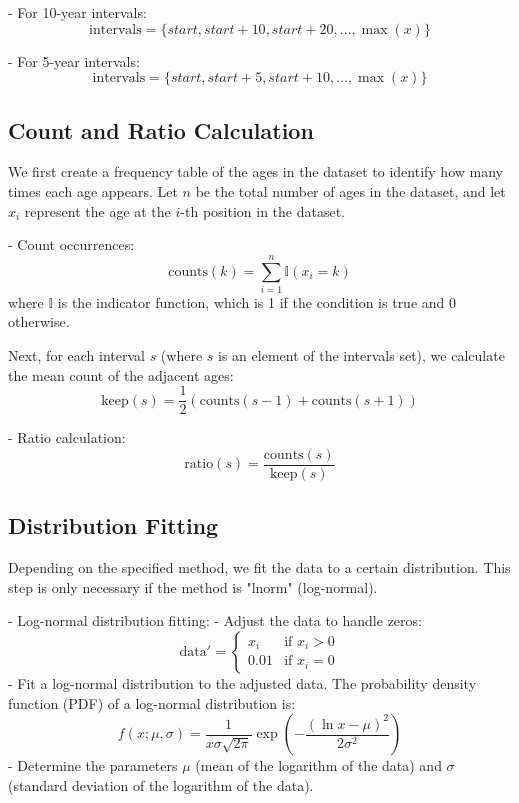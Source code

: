 \documentclass[pdflatex,sn-mathphys-num]{sn-jnl}%
\theoremstyle{thmstyleone}%
\theoremstyle{thmstyletwo}%
\theoremstyle{thmstylethree}%
\begin{document}
- For 10-year intervals:
  \[
  \text{intervals} = \{start, start + 10, start + 20, \ldots, \max(x)\}
  \]

- For 5-year intervals:
  \[
  \text{intervals} = \{start, start + 5, start + 10, \ldots, \max(x)\}
  \]

\subsection{Count and Ratio Calculation}

We first create a frequency table of the ages in the dataset to identify how many times each age appears. Let \( n \) be the total number of ages in the dataset, and let \( x_i \) represent the age at the \( i \)-th position in the dataset.

- Count occurrences:
  \[
  \text{counts}(k) = \sum_{i=1}^{n} \mathbb{I}(x_i = k)
  \]
  where \( \mathbb{I} \) is the indicator function, which is 1 if the condition is true and 0 otherwise.

Next, for each interval \( s \) (where \( s \) is an element of the intervals set), we calculate the mean count of the adjacent ages:
\[
\text{keep}(s) = \frac{1}{2} \left( \text{counts}(s-1) + \text{counts}(s+1) \right)
\]

- Ratio calculation:
  \[
  \text{ratio}(s) = \frac{\text{counts}(s)}{\text{keep}(s)}
  \]

\subsection{Distribution Fitting}

Depending on the specified method, we fit the data to a certain distribution. This step is only necessary if the method is "lnorm" (log-normal).

- Log-normal distribution fitting:
  - Adjust the data to handle zeros:
    \[
    \text{data}' = \begin{cases} 
    x_i & \text{if } x_i > 0 \\
    0.01 & \text{if } x_i = 0
    \end{cases}
    \]
  - Fit a log-normal distribution to the adjusted data. The probability density function (PDF) of a log-normal distribution is:
    \[
    f(x; \mu, \sigma) = \frac{1}{x\sigma\sqrt{2\pi}} \exp\left(-\frac{(\ln x - \mu)^2}{2\sigma^2}\right)
    \]
  - Determine the parameters \( \mu \) (mean of the logarithm of the data) and \( \sigma \) (standard deviation of the logarithm of the data).
\end{document}
